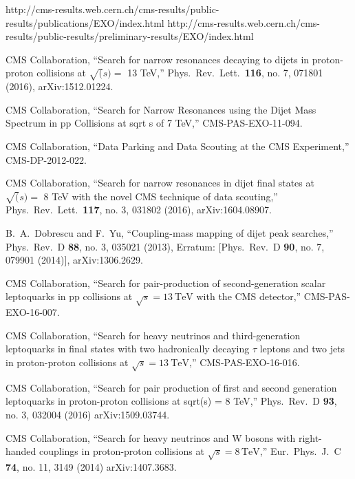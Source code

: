 \documentclass[epj]{webofc}
\begin{document}
\begin{thebibliography}{}
%
%


http://cms-results.web.cern.ch/cms-results/public-results/publications/EXO/index.html 
http://cms-results.web.cern.ch/cms-results/public-results/preliminary-results/EXO/index.html

  CMS Collaboration,
  ``Search for narrow resonances decaying to dijets in proton-proton collisions at $\sqrt(s) =$ 13 TeV,''
  Phys.\ Rev.\ Lett.\  {\bf 116}, no. 7, 071801 (2016),
  arXiv:1512.01224.

  CMS Collaboration,
  ``Search for Narrow Resonances using the Dijet Mass Spectrum in pp Collisions at sqrt s of 7 TeV,''
  CMS-PAS-EXO-11-094.

  CMS Collaboration,
  ``Data Parking and Data Scouting at the CMS Experiment,''
  CMS-DP-2012-022.

  CMS Collaboration,
  ``Search for narrow resonances in dijet final states at $\sqrt(s)=$ 8 TeV with the novel CMS technique of data scouting,''
  Phys.\ Rev.\ Lett.\  {\bf 117}, no. 3, 031802 (2016), 
  arXiv:1604.08907.

  B.~A.~Dobrescu and F.~Yu,
  ``Coupling-mass mapping of dijet peak searches,''
  Phys.\ Rev.\ D {\bf 88}, no. 3, 035021 (2013), 
  Erratum: [Phys.\ Rev.\ D {\bf 90}, no. 7, 079901 (2014)], 
  arXiv:1306.2629.

  CMS Collaboration,
  ``Search for pair-production of second-generation scalar leptoquarks
  in pp collisions at $\sqrt{s}=13~\mathrm{TeV}$ with the CMS
  detector,'' CMS-PAS-EXO-16-007.

  CMS Collaboration,
  ``Search for heavy neutrinos and third-generation leptoquarks in final states with two hadronically decaying $\tau$ leptons and two jets in proton-proton collisions at $\sqrt{s} = 13~\mathrm{TeV}$,''
  CMS-PAS-EXO-16-016.

  CMS Collaboration,
  ``Search for pair production of first and second generation leptoquarks in proton-proton collisions at sqrt(s) = 8 TeV,''
  Phys.\ Rev.\ D {\bf 93}, no. 3, 032004 (2016)
  arXiv:1509.03744.

  CMS Collaboration,
  ``Search for heavy neutrinos and $\mathrm {W}$ bosons with right-handed couplings in proton-proton collisions at $\sqrt{s} = 8\,\text {TeV} $,''
  Eur.\ Phys.\ J.\ C {\bf 74}, no. 11, 3149 (2014)
  arXiv:1407.3683.

\end{thebibliography}
\end{document}
